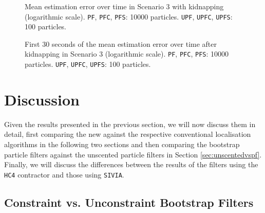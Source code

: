 \begin{figure}
	\centering
	\setlength{} 	
	\setlength\figurewidth{0.9\textheight}		
	\caption[Mean estimation error over time in Scenario 3 with kidnapping. \texttt{PF}, \texttt{PFC}, \texttt{PFS}: 10000 particles. \texttt{UPF}, \texttt{UPFC}, \texttt{UPFS}: 100 particles.]
	{Mean estimation error over time in Scenario 3 with kidnapping (logarithmic scale). \texttt{PF}, \texttt{PFC}, \texttt{PFS}: 10000 particles. \texttt{UPF}, \texttt{UPFC}, \texttt{UPFS}: 100 particles.}
	\label{fig:2018-09-03-13-54-12-results-figure-4}			
\end{figure}

\begin{figure}
	\centering
	\setlength{} 	
	\setlength\figurewidth{0.9\textheight}		
	\caption[First 30 seconds of the mean estimation error over time after kidnapping in Scenario 3. \texttt{PF}, \texttt{PFC}, \texttt{PFS}: 10000 particles. \texttt{UPF}, \texttt{UPFC}, \texttt{UPFS}: 100 particles.]
	{First 30 seconds of the mean estimation error over time after kidnapping in Scenario 3 (logarithmic scale). \texttt{PF}, \texttt{PFC}, \texttt{PFS}: 10000 particles. \texttt{UPF}, \texttt{UPFC}, \texttt{UPFS}: 100 particles.}
	\label{fig:2018-09-03-13-54-12-results-figure-6}			
\end{figure}



\section{Discussion}\label{sec:discussion}

Given the results presented in the previous section, we will now discuss them in detail, first comparing the new against the respective conventional localisation algorithms in the following two sections and then comparing the bootstrap particle filters against the unscented particle filters in Section \ref{sec:unscentedvspf}. Finally, we will discuss the differences between the results of the filters using the \texttt{HC4} contractor and those using \texttt{SIVIA}.

\subsection[Bootstrap Filters]{Constraint vs. Unconstraint Bootstrap Filters}

